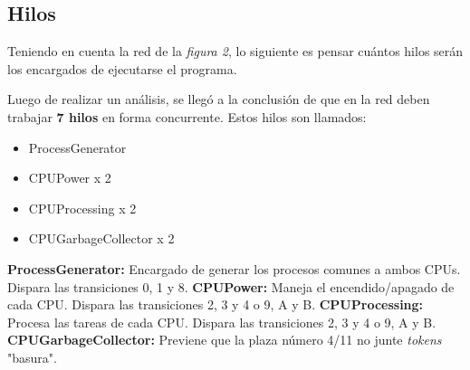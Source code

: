 \documentclass{article}
\begin{document}
    \subsection{Hilos}
    Teniendo en cuenta la red de la \emph{figura 2}, lo siguiente es pensar cuántos hilos
    serán los encargados de ejecutarse el programa. \par
    Luego de realizar un análisis, se llegó a la conclusión de que en la red deben trabajar
    \textbf{7 hilos} en forma concurrente. Estos hilos son llamados:
    \begin{itemize}
        \item ProcessGenerator
        \item CPUPower x 2
        \item CPUProcessing x 2
        \item CPUGarbageCollector x 2
    \end{itemize}
    \textbf{ProcessGenerator:} Encargado de generar los procesos comunes a ambos CPUs.
    Dispara las transiciones 0, 1 y 8. \newline \newline
    \textbf{CPUPower:} Maneja el encendido/apagado de cada CPU. Dispara las transiciones
    2, 3 y 4 o 9, A y B. \newline \newline
    \textbf{CPUProcessing:} Procesa las tareas de cada CPU. Dispara las transiciones
    2, 3 y 4 o 9, A y B. \newline \newline
    \textbf{CPUGarbageCollector:} Previene que la plaza número 4/11 no junte \emph{tokens}
    "basura". \newline
\end{document}
